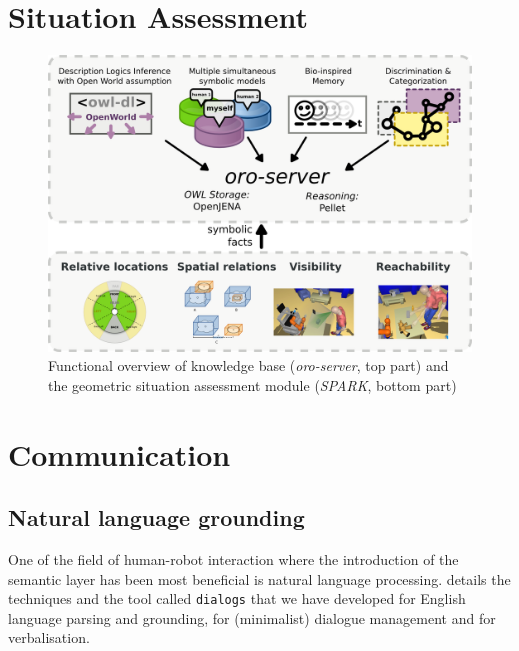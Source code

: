 \documentclass[letterpaper, 10 pt, conference]{ieeeconf}  %
\begin{document}
\section{Situation Assessment}
\label{sect|sit-ass}

\begin{figure}
        \centering
        \includegraphics[width=\columnwidth]{spark-oro}
        \caption{Functional overview of knowledge base (\emph{oro-server}, top part) and the geometric situation assessment module (\emph{SPARK}, bottom part)}
        \label{fig|spark-oro}
\end{figure}

\cite{Sisbot2011}

\section{Communication}
\label{sect|com}

\subsection{Natural language grounding}

One of the field of human-robot interaction where the introduction of the
semantic layer has been most beneficial is natural language processing.
\cite{Lemaignan2011a} details the techniques and the tool called
\texttt{dialogs} that we have developed for English language parsing and
grounding, for (minimalist) dialogue management and for verbalisation.
\end{document}
